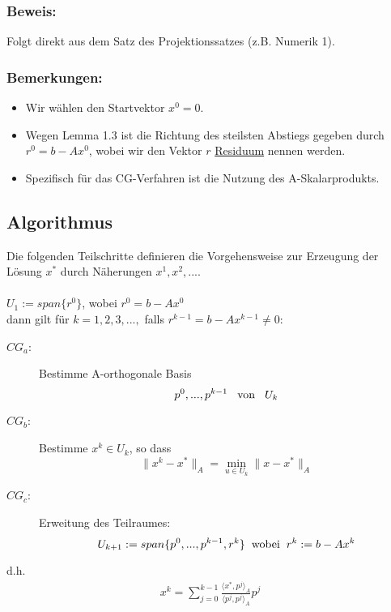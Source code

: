 \documentclass{article}
\begin{document}
\subsubsection{Beweis:}
Folgt direkt aus dem Satz des Projektionssatzes (z.B. Numerik 1).

\subsubsection{Bemerkungen:}
\begin{itemize}
	\item Wir wählen den Startvektor $x^{0} = 0$.
	\item Wegen Lemma 1.3 ist die Richtung des steilsten Abstiegs gegeben durch $r^{0} = b - Ax^{0}$, wobei wir den Vektor $r$ \underline{Residuum} nennen werden.
	\item Spezifisch für das CG-Verfahren ist die Nutzung des A-Skalarprodukts.
\end{itemize}

\subsection{Algorithmus}
Die folgenden Teilschritte definieren die Vorgehensweise zur Erzeugung der Lösung $x^{*}$ durch Näherungen $x^{1}, x^{2},...$.
\\\\$U_{1} := span\{r^{0}\}$, wobei $r^{0} = b - Ax^{0}$
\\dann gilt für $k = 1,2,3,...,$ falls $r^{k-1} = b - Ax^{k-1} \ne 0$:
\begin{description}
\item[$CG_{a}$:] Bestimme A-orthogonale Basis
\begin{equation}
p^{0},...,p^{k-1} \hspace{3mm} \textnormal{von} \hspace{3mm} U_{k}
\end{equation}
\item[$CG_{b}$:] Bestimme $x^{k} \in U_{k}$, so dass
\begin{equation}
\|x^{k} - x^{*}\|_{A} = \underset{u \in U_{k}}{\min} \|x - x^{*}\|_{A}
\end{equation}
\item[$CG_{c}$:] Erweitung des Teilraumes:
\begin{equation}
U_{k+1} := span\{p^{0},...,p^{k-1},r^{k}\} \hspace{2mm} \textnormal{wobei} \hspace{2mm} r^{k} := b - Ax^{k}
\end{equation}
\end{description}
d.h.
\begin{align}
x^{k} = \sum_{j=0}^{k-1} \frac {\langle x^{*}, p^{j} \rangle _{A}} {\langle p^{j}, p^{j} \rangle _{A}} p^{j}
\end{align}
\end{document}
